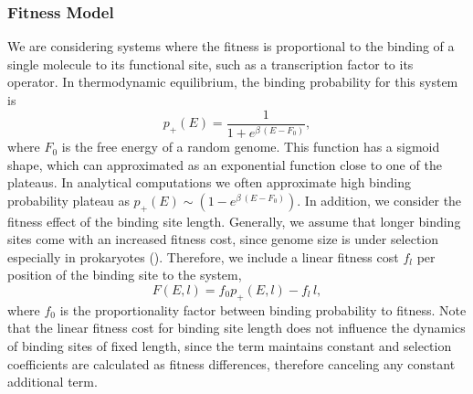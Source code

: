 \subsubsection*{Fitness Model}
    We are considering systems where the fitness is proportional to the binding of a single molecule to its functional site, such as a transcription factor to its operator. In thermodynamic equilibrium, the binding probability for this system is \cite{lassig2007}
	\begin{equation}
		p_+(E)=\frac{1}{1+e^{\beta\,(E-F_0)}},
    \end{equation}
    where $F_0$ is the free energy of a random genome. This function has a sigmoid shape, which can approximated as an exponential function close to one of the plateaus. In analytical computations we often approximate high binding probability plateau as $p_+(E) \sim (1-e^{\beta\,(E-F_0)})$. In addition, we consider the fitness effect of the binding site length. Generally, we assume that longer binding sites come with an increased fitness cost, since genome size is under selection especially in prokaryotes (). Therefore, we include a linear fitness cost $f_l$ per position of the binding site to the system,
    \begin{equation}
        F(E,l) = f_0p_+(E,l)-f_l\,l,\label{equ:fitness_function}
    \end{equation}
    where $f_0$ is the proportionality factor between binding probability to fitness. Note that the linear fitness cost for binding site length does not influence the dynamics of binding sites of fixed length, since the term maintains constant and selection coefficients are calculated as fitness differences, therefore canceling any constant additional term.

